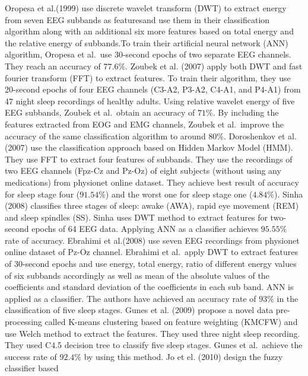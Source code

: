 \documentclass[12pt,letterpaper]{article}
\begin{document}
Oropesa et al.(1999) use discrete wavelet transform (DWT) to extract energy from seven EEG subbands as featuresand use them in their classification algorithm along with an additional six more features based on total energy and the relative energy of subbands.To train their artificial neural network (ANN) algorithm, Oropesa et al.\ use 30-second epochs of two separate EEG channels. They reach an accuracy of $77.6\%$. Zoubek et al. (2007) apply both DWT and fast fourier transform (FFT) to extract features. To train their algorithm, they use 20-second epochs of four EEG
channels (C3-A2, P3-A2, C4-A1, and P4-A1) from 47 night sleep recordings of healthy adults. Using relative wavelet energy of five EEG subbands, Zoubek et al.\ obtain an accuracy of $71\%$. By including the features extracted from EOG and EMG channels, Zoubek et al.\ improve the accuracy of the same classification algorithm to around $80\%$. Doroshenkov et al.(2007) use the classification approach based on Hidden Markov Model (HMM). They use FFT to extract four features of subbands. They use the recordings of two EEG channels (Fpz-Cz and Pz-Oz) of eight subjects (without using any medications) from physionet online dataset. They achieve best result of accuracy for sleep stage four ($91.54\%$) and the worst one for sleep stage one ($4.84\%$).  Sinha (2008) classifies three stages of sleep: awake (AWA), rapid eye movement (REM) and sleep spindles (SS). Sinha uses DWT method to extract features for two-second epochs of 64 EEG data. Applying ANN as a classifier achieves $95.55\%$ rate of accuracy. Ebrahimi et al.(2008) use seven EEG recordings from physionet online dataset of Pz-Oz channel. Ebrahimi et al.\ apply DWT to extract features of 30-second epochs and use energy, total energy, ratio of different energy values of six subbands accordingly as well as mean of the absolute values of the coefficients and standard deviation of the coefficients in each sub band. ANN is applied as a classifier. The authors have achieved an accuracy rate of $93\%$ in the classification of five sleep stages. Gunes et al. (2009) propose a novel data pre-processing called K-means clustering based on feature weighting (KMCFW) and use Welch method to extract the features. They used three night sleep recording. They used C4.5 decision tree to classify five sleep stages. Gunes et al.\ achieve the success rate of $92.4\%$ by using this method. Jo et el. (2010) design the fuzzy classifier based
\end{document}
